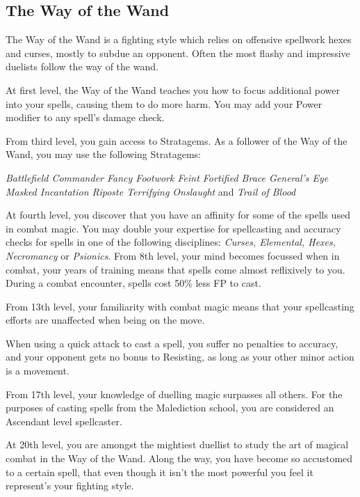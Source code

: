 {\newpage
\subsection{\bf The Way of the Wand}

The Way of the Wand is a fighting style which relies on offensive spellwork \minus{} hexes and curses, mostly  \minus{} to subdue an opponent. Often the most flashy and impressive duelists follow the way of the wand. 

{
	At first level, the Way of the Wand teaches you how to focus additional power into your spells, causing them to do more harm. You may add your Power modifier to any spell's damage check.   
}



From third level, you gain access to Stratagems. As a follower of the Way of the Wand, you may use the following Stratagems:

{\it
Battlefield Commander\comma{} Fancy Footwork\comma{} Feint\comma{} Fortified Brace\comma{} General’s Eye\comma{} Masked Incantation\comma{} Riposte\comma{} Terrifying Onslaught } and {\it Trail of Blood
}

{
	At fourth level, you discover that you have an affinity for some of the spells used in combat magic.  You may double your expertise for spellcasting and accuracy checks for spells in one of the following disciplines: {\it  Curses, Elemental, Hexes, Necromancy} or {\it Psionics}. 
}
{
	From 8th level, your mind becomes focussed when in combat, your years of training means that spells come almost reflixively to you. 
	During a combat encounter, spells cost 50\% less FP to cast. 
}
{
	From 13th level, your familiarity with combat magic means that your spellcasting efforts are unaffected when being on the move. 
	
	When using a quick attack to cast a spell, you suffer no penalties to accuracy, and your opponent gets no bonus to Resisting, as long as your other minor action is a movement. 
}

{
	From 17th level, your knowledge of duelling magic surpasses all others. For the purposes of casting spells from the Malediction school, you are considered an Ascendant level spellcaster. 
	
}

{
At 20th level, you are amongst the mightiest duellist to study the art of magical combat in the Way of the Wand. Along the way, you have become so accustomed to a certain spell, that \minus{} even though it isn't the most powerful \minus{} you feel it represent's your fighting style.  

}}
